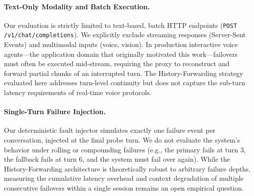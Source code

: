 \paragraph{Text-Only Modality and Batch Execution.}
Our evaluation is strictly limited to text-based, batch HTTP endpoints (\texttt{POST /v1/chat/completions}). We explicitly exclude streaming responses (Server-Sent Events) and multimodal inputs (voice, vision). In production interactive voice agents---the application domain that originally motivated this work---failovers must often be executed mid-stream, requiring the proxy to reconstruct and forward partial chunks of an interrupted turn. The History-Forwarding strategy evaluated here addresses turn-level continuity but does not capture the sub-turn latency requirements of real-time voice protocols. 

\paragraph{Single-Turn Failure Injection.}
Our deterministic fault injector simulates exactly one failure event per conversation, injected at the final probe turn. We do not evaluate the system's behavior under rolling or compounding failures (e.g., the primary fails at turn 3, the fallback fails at turn 6, and the system must fail over again). While the History-Forwarding architecture is theoretically robust to arbitrary failure depths, measuring the cumulative latency overhead and context degradation of multiple consecutive failovers within a single session remains an open empirical question.
